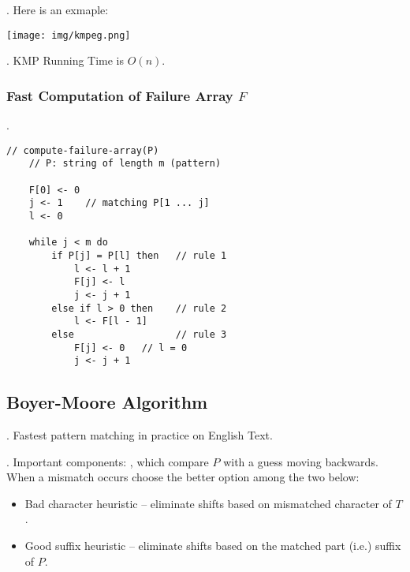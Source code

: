 \documentclass{article}
\begin{document}
\begin{examplee}[].
    Here is an exmaple: \begin{center}
        \texttt{[image: img/kmpeg.png]}
    \end{center}
\end{examplee}

\begin{result}[].
    KMP Running Time is $O(n)$. 
\end{result}

\subsubsection{Fast Computation of Failure Array $F$}

\begin{codes}[].
    \begin{lstlisting}[style=cppstyle]
    // compute-failure-array(P)
    // P: string of length m (pattern)
    
    F[0] <- 0
    j <- 1    // matching P[1 ... j]
    l <- 0
    
    while j < m do
        if P[j] = P[l] then   // rule 1
            l <- l + 1
            F[j] <- l
            j <- j + 1
        else if l > 0 then    // rule 2
            l <- F[l - 1]
        else                  // rule 3
            F[j] <- 0   // l = 0
            j <- j + 1
    \end{lstlisting}
\end{codes}

\subsection{Boyer-Moore Algorithm}

\begin{comm}[].
    Fastest pattern matching in practice on English Text. 
\end{comm}

\begin{algo}[].
    Important components: , which compare $P$ with a guess moving backwards. When a mismatch occurs choose the better option among the two below: \begin{itemize}
        \item Bad character heuristic -- eliminate shifts based on mismatched character of $T$. 
        \item Good suffix heuristic -- eliminate shifts based on the matched part (i.e.) suffix of $P$. 
    \end{itemize} 
\end{algo}
\end{document}
